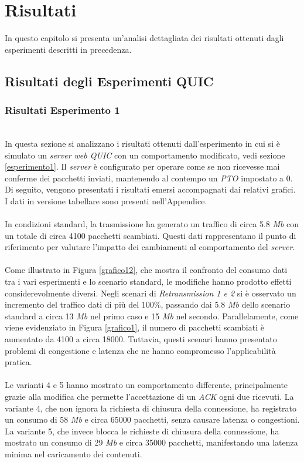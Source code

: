 \chapter{Risultati}
\label{cap:risultati}

In questo capitolo si presenta un'analisi dettagliata dei risultati ottenuti dagli esperimenti descritti in precedenza.

\section{Risultati degli Esperimenti QUIC}
\subsection{Risultati Esperimento 1}
~\\
\indent In questa sezione si analizzano i risultati ottenuti dall'esperimento in cui si è simulato un \emph{server web QUIC} con un comportamento modificato, vedi sezione \ref{esperimento1}.
Il \emph{server} è configurato per operare come se non ricevesse mai conferme dei pacchetti inviati, mantenendo al contempo un \emph{PTO} impostato a 0. 
Di seguito, vengono presentati i risultati emersi accompagnati dai relativi grafici. I dati in versione tabellare sono presenti nell'Appendice.
\\\\
In condizioni standard, la trasmissione ha generato un traffico di circa 5.8 \emph{Mb} con un totale di circa 4100 pacchetti scambiati. 
Questi dati rappresentano il punto di riferimento per valutare l'impatto dei cambiamenti al comportamento del \emph{server}.
\\\\
Come illustrato in Figura \ref{grafico12}, che mostra il confronto del consumo dati tra i vari esperimenti e lo scenario standard, le modifiche hanno prodotto effetti considerevolmente diversi.
Negli scenari di \emph{Retransmission 1 e 2} si è osservato un incremento del traffico dati di più del $100\%$, passando dai 5.8 \emph{Mb} dello scenario standard a circa 13 \emph{Mb} nel primo caso e 15 \emph{Mb} nel secondo. 
Parallelamente, come viene evidenziato in Figura \ref{grafico1}, il numero di pacchetti scambiati è aumentato da 4100 a circa 18000. 
Tuttavia, questi scenari hanno presentato problemi di congestione e latenza che ne hanno compromesso l'applicabilità pratica.
\\\\
Le varianti 4 e 5 hanno mostrato un comportamento differente, principalmente grazie alla modifica che permette l'accettazione di un \emph{ACK} ogni due ricevuti.
La variante 4, che non ignora la richiesta di chiusura della connessione, ha registrato un consumo di 58 \emph{Mb} e circa 65000 pacchetti, senza causare latenza o congestioni. 
La variante 5, che invece blocca le richieste di chiusura della connessione, ha mostrato un consumo di 29 \emph{Mb} e circa 35000 pacchetti, manifestando una latenza minima nel caricamento dei contenuti.

